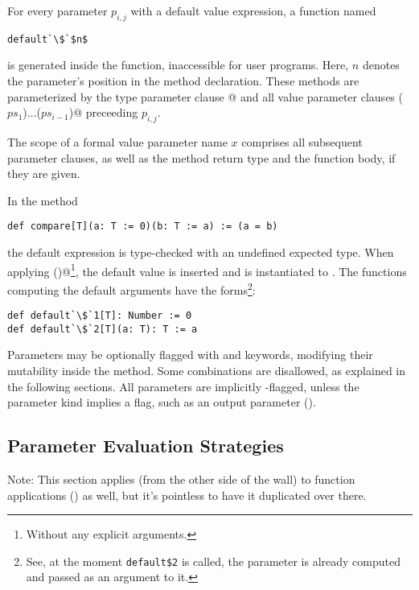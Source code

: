 For every parameter $p_{i,j}$ with a default value expression, a function named 
\begin{lstlisting}[escapechar=`]
default`\$`$n$
\end{lstlisting}
is generated inside the function, inaccessible for user programs. Here, $n$ denotes the parameter's position in the method declaration. These methods are parameterized by the type parameter clause \lstinline@[$\tps$]@ and all value parameter clauses \lstinline@($ps_1$)$\ldots$($ps_{i-1}$)@ preceeding $p_{i,j}$.

The scope of a formal value parameter name $x$ comprises all subsequent parameter clauses, as well as the method return type and the function body, if they are given.

\example In the method
\begin{lstlisting}
def compare[T](a: T := 0)(b: T := a) := (a = b)
\end{lstlisting}
the default expression  is type-checked with an undefined expected type. When applying \lstinline@compare()@\footnote{Without any explicit arguments.}, the default value  is inserted and  is instantiated to . The functions computing the default arguments have the forms\footnote{See, at the moment \lstinline[mathescape=false]!default$2! is called, the parameter  is already computed and passed as an argument to it.}:
\begin{lstlisting}[escapechar=`]
def default`\$`1[T]: Number := 0
def default`\$`2[T](a: T): T := a
\end{lstlisting}

Parameters may be optionally flagged with  and  keywords, modifying their mutability inside the method. Some combinations are disallowed, as explained in the following sections. All parameters are implicitly -flagged, unless the parameter kind implies a  flag, such as an output parameter ().





\subsection{Parameter Evaluation Strategies}
\label{sec:param-eval-strategies}

Note: This section applies (from the other side of the wall) to function applications () as well, but it's pointless to have it duplicated over there. 

